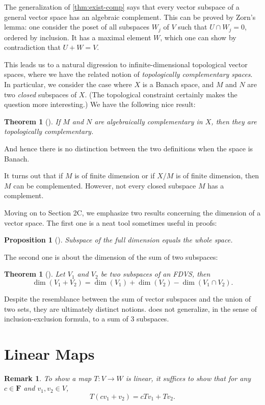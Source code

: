 \documentclass[11pt]{article}
\numberwithin{equation}{section}
\theoremstyle{plain-star}
\newtheorem{thm}[equation]{Theorem}
\newtheorem*{thm*}{Theorem}
\newtheorem{prop}[equation]{Proposition}
\theoremstyle{definition-star}
\theoremstyle{remark-star}
\newtheorem*{rem*}{Remark}
\theoremstyle{plain-star}
\newcommand{\F}{\mathbf{F}}
\begin{document}
The generalization of \cref{thm:exist-comp} says that every vector subspace of a general vector space has an algebraic complement. This can be proved by Zorn's lemma: one consider the poset of all subspaces $W_j$ of $V$ such that $U \cap W_j = {0}$, ordered by inclusion. It has a maximal element $W$, which one can show by contradiction that $U + W = V$.

This leads us to a natural digression to infinite-dimensional topological vector spaces, where we have the related notion of \emph{topologically complementary spaces}. In particular, we consider the case where $X$ is a Banach space, and $M$ and $N$ are two \emph{closed} subspaces of $X$. (The topological constraint certainly makes the question more interesting.) We have the following nice result: 
\begin{thm*}[{\cite[Theorem~13.1]{conway2007func}}]
    If $M$ and $N$ are algebraically complementary in $X$, then they are topologically complementary.
\end{thm*}
And hence there is no distinction between the two definitions when the space is Banach.

It turns out that if $M$ is of finite dimension or if $X/M$ is of finite dimension, then $M$ can be complemented. However, not every closed subspace $M$ has a complement.

Moving on to Section 2C, we emphasize two results concerning the dimension of a vector space. The first one is a neat tool sometimes useful in proofs: 
\begin{prop}[{\cite[2.39]{axler2024}}]
    Subspace of the full dimension equals the whole space.
\end{prop}
The second one is about the dimension of the sum of two subspaces: 
\begin{thm}[{\cite[2.43]{axler2024}}] \label{thm:sum-dim-two-spaces}
    Let $V_1$ and $V_2$ be two subspaces of an FDVS, then \[
        \dim(V_1+V_2) = \dim(V_1) + \dim(V_2) - \dim(V_1 \cap V_2).
    \]
\end{thm}
Despite the resemblance between the sum of vector subspaces and the union of two sets, they are ultimately distinct notions.  does not generalize, in the sense of inclusion-exclusion formula, to a sum of $3$ subspaces.

\section{Linear Maps}
\begin{rem*}
    To show a map $T\colon V\to W$ is linear, it suffices to show that for any $c \in \F$ and $v_1,v_2\in V$, \[T(cv_1 + v_2) = cTv_1 + Tv_2.\]
\end{rem*}
\end{document}

